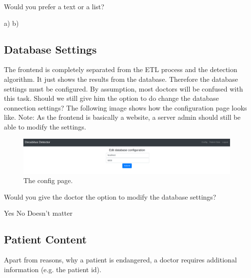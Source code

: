 \documentclass{exam}
\begin{document}
\begin{questions}

\question Would you prefer a text or a list?

\begin{checkboxes}
	\choice a)
	\choice b)
\end{checkboxes}

\end{questions}

\subsection*{Database Settings}

The frontend is completely separated from the ETL process and the detection algorithm. It just shows the results from the database. 
Therefore the database settings must be configured. By assumption, most doctors will be confused with this task. Should we still give him the option to 
do change the database connection settings? The following image shows how the configuration page looks like. 
Note: As the frontend is basically a website, a server admin should still be able to modify the settings.  

\begin{figure}[H]
	\centering
  \includegraphics[width=0.8\linewidth]{images/db.png}
	\captionsetup{labelformat=empty}
	\caption{The config page.}
  \label{fig:text}
\end{figure}

\begin{questions}
\question Would you give the doctor the option to modify the database settings?

\begin{checkboxes}
	\choice Yes
	\choice No
	\choice Doesn't matter
\end{checkboxes}

\end{questions}

\subsection*{Patient Content}

Apart from reasons, why a patient is endangered, a doctor requires additional information (e.g. the patient id). 
\end{document}
